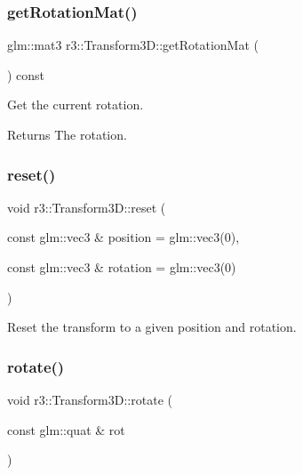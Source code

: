 \subsubsection{\texorpdfstring{get\+Rotation\+Mat()}{getRotationMat()}}
{\footnotesize\ttfamily glm\+::mat3 r3\+::\+Transform3\+D\+::get\+Rotation\+Mat (\begin{DoxyParamCaption}{ }\end{DoxyParamCaption}) const}



Get the current rotation. 

\begin{DoxyReturn}{Returns}
The rotation. 
\end{DoxyReturn}
\mbox{\label{classr3_1_1_transform3_d_ae0eadc0ced65b65d78d721209f8b45de}} 
\subsubsection{\texorpdfstring{reset()}{reset()}}
{\footnotesize\ttfamily void r3\+::\+Transform3\+D\+::reset (\begin{DoxyParamCaption}\item[{const glm\+::vec3 \&}]{position = {\ttfamily glm\+:\+:vec3(0)},  }\item[{const glm\+::vec3 \&}]{rotation = {\ttfamily glm\+:\+:vec3(0)} }\end{DoxyParamCaption})}



Reset the transform to a given position and rotation. 

\mbox{\label{classr3_1_1_transform3_d_aaf633209948d35ca4b90422614a84478}} 
\subsubsection{\texorpdfstring{rotate()}{rotate()}\hspace{0.1cm}{\footnotesize\ttfamily [1/2]}}
{\footnotesize\ttfamily void r3\+::\+Transform3\+D\+::rotate (\begin{DoxyParamCaption}\item[{const glm\+::quat \&}]{rot }\end{DoxyParamCaption})}




